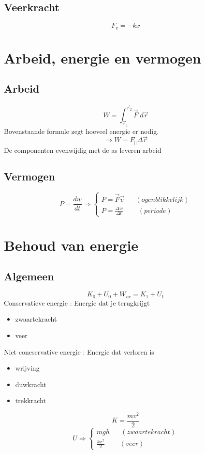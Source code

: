\documentclass[12pt]{report}
\begin{document}
\section{Veerkracht}
$$ F_v = -kx $$


\chapter{Arbeid, energie en vermogen}
\section{Arbeid}
$$ W = \int_{\overrightarrow{r}_1}^{\overrightarrow{r}_2} \overrightarrow{F} \; d\overrightarrow{r}$$
Bovenstaande formule zegt hoeveel energie er nodig.
$$\Rightarrow W = F_{||} \Delta\overrightarrow{r}$$
De componenten evenwijdig met de as leveren arbeid
\section{Vermogen}
$$ P = \frac{dw}{dt} \Rightarrow 
\begin{cases}
   P = \overrightarrow{F}\overrightarrow{v} \;\;\;\;\;\; (ogenblikkelijk) \\ 
   P = \frac{\Delta w}{\Delta t} \;\;\;\;\;\;\;\; (periode)
\end{cases}
$$
\chapter{Behoud van energie}
\section{Algemeen}
$$K_0 + U_0 + W_{nc} = K_1 + U_1$$
Conservatieve energie : Energie dat je terugkrijgt
\begin{itemize}
 \item zwaartekracht
 \item veer
\end{itemize}
Niet coneservative energie : Energie dat verloren is
\begin{itemize}
 \item wrijving
 \item duwkracht
 \item trekkracht
\end{itemize}

$$ K = \frac{mv^{2}}{2}$$
$$ U \Rightarrow 
\begin{cases}
  mgh \;\;\;\;\;\; (zwaartekracht)\\ 
  \frac{kx^{2}}{2} \;\;\;\;\;\;\;\; (veer)
\end{cases}
$$
\end{document}
